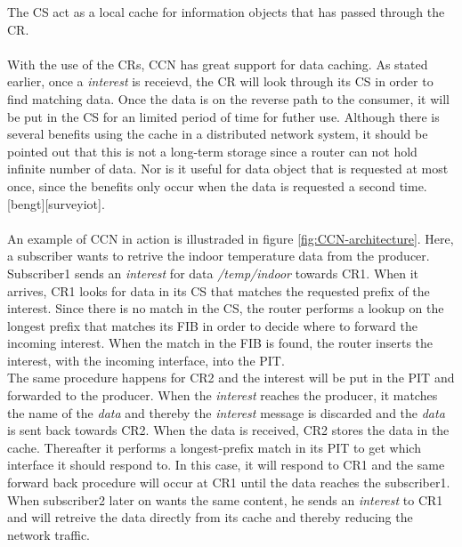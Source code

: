 The CS act as a local cache for information objects that has passed through the CR.
\\\\
With the use of the CRs, CCN has great support for data caching. As stated earlier, once a \textit{interest} is receievd, the CR will look through its CS in order to find matching data. Once the data is on the reverse path to the consumer, it will be put in the CS for an limited period of time for futher use. Although there is several benefits using the cache in a distributed network system, it should be pointed out that this is not a long-term storage since a router can not hold infinite number of data. Nor is it useful for data object that is requested at most once, since the benefits only occur when the data is requested a second time. [bengt][surveyiot].
\\\\
An example of CCN in action is illustraded in figure \ref{fig:CCN-architecture}. Here, a subscriber wants to retrive the indoor temperature data from the producer.
Subscriber1 sends an \textit{interest} for data \textit{/temp/indoor} towards CR1. When it arrives, CR1 looks for data in its CS that matches the requested prefix of the interest. Since there is no match in the CS, the router performs a lookup on the longest prefix that matches its FIB in order to decide where to forward the incoming interest. When the match in the FIB is found, the router inserts the interest, with the incoming interface, into the PIT.\\
The same procedure happens for CR2 and the interest will be put in the PIT and forwarded to the producer. When the \textit{interest} reaches the producer, it matches the name of the \textit{data} and thereby the \textit{interest} message is discarded and the \textit{data} is sent back towards CR2. When the data is received, CR2 stores the data in the cache. Thereafter it performs a longest-prefix match in its PIT to get which interface it should respond to. In this case, it will respond to CR1 and the same forward back procedure will occur at CR1 until the data reaches the subscriber1.\\
When subscriber2 later on wants the same content, he sends an \textit{interest} to CR1 and will retreive the data directly from its cache and thereby reducing the network traffic.



